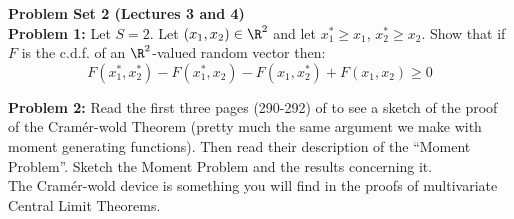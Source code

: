 \documentclass[11pt]{article} %
\begin{document}
\onehalfspace

\noindent \textbf{Problem Set 2 (Lectures 3 and 4)}\\

\noindent \textbf{Problem 1:} Let $S=2$. Let $(x_1,x_2) \in \R^{2}$ and let $x_1^* \geq x_1$, $x_2^* \geq x_2$. Show that if $F$ is the c.d.f. of an $\R^2$-valued random vector then: 
$$F(x_1^*, x_2^*)-F(x_1^*, x_2)-F(x_1, x_2^*)+F(x_1, x_2) \geq 0$$

\noindent \textbf{Problem 2:} Read the first three pages (290-292) of \cite{cramer1936some} to see a sketch of the proof of the Cram\'er-wold Theorem (pretty much the same argument we make with moment generating functions). Then read their description of the ``Moment Problem''. Sketch the Moment Problem and the results concerning it.   \\

 The Cram\'er-wold device is something you will find in the proofs of multivariate Central Limit Theorems. \\
  
\end{document}
